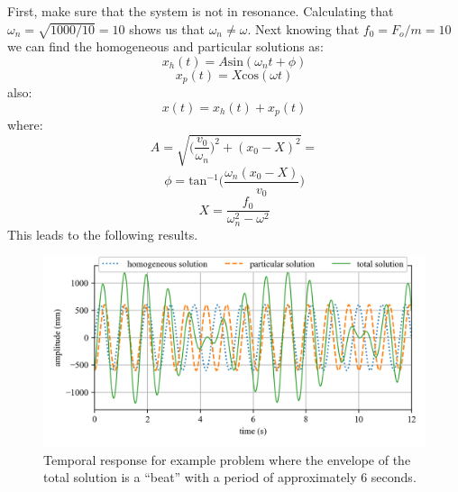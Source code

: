\documentclass[12pt,letter]{article}
\begin{document}
\begin{example}
	 First, make sure that the system is not in resonance. Calculating that $\omega_n = \sqrt{1000/10} = 10$ shows us that $\omega_n \neq \omega$. Next knowing that $f_0 = F_o/m = 10$ we can find the homogeneous and particular solutions as:
	\begin{equation}
		x_h(t) = A\text{sin}(\omega_n t + \phi)
	\end{equation}				
	\begin{equation}
		x_p(t) = X\text{cos}(\omega t) 
	\end{equation}	
	also:			
	\begin{equation}
		x(t) = x_h(t) + x_p(t)
	\end{equation}	
	where:			
	\begin{equation}
		A = \sqrt{\bigg(\frac{v_0}{\omega_n}\bigg)^2+(x_0-X)^2} = 
	\end{equation}				
	\begin{equation}
		\phi = \text{tan}^{-1}\bigg(\frac{\omega_n(x_0-X)}{v_0}\bigg)
	\end{equation}				
	\begin{equation}
		X = \frac{f_0}{\omega_n^2-\omega^2}
	\end{equation}			
	This leads to the following results. 
	\begin{figure}[H]
		\centering
		\includegraphics[]{../figures/homogeneous_and_particular_solutions.png}
		\caption{Temporal response for example problem where the envelope of the total solution is a ``beat'' with a period of approximately 6 seconds.}
	\end{figure}			

\end{example}
\end{document}
